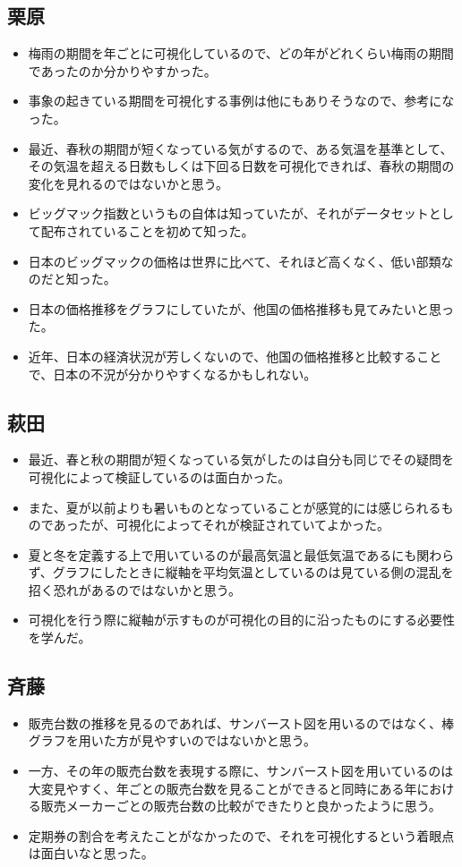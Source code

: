 \documentclass{jsarticle}
\begin{document}
\subsection*{栗原}
\begin{itemize}
    \item 梅雨の期間を年ごとに可視化しているので、どの年がどれくらい梅雨の期間であったのか分かりやすかった。
    \item 事象の起きている期間を可視化する事例は他にもありそうなので、参考になった。
    \item 最近、春秋の期間が短くなっている気がするので、ある気温を基準として、その気温を超える日数もしくは下回る日数を可視化できれば、春秋の期間の変化を見れるのではないかと思う。
    \item ビッグマック指数というもの自体は知っていたが、それがデータセットとして配布されていることを初めて知った。
    \item 日本のビッグマックの価格は世界に比べて、それほど高くなく、低い部類なのだと知った。
    \item 日本の価格推移をグラフにしていたが、他国の価格推移も見てみたいと思った。
    \item 近年、日本の経済状況が芳しくないので、他国の価格推移と比較することで、日本の不況が分かりやすくなるかもしれない。
\end{itemize}
\subsection*{萩田}
\begin{itemize}
    \item 最近、春と秋の期間が短くなっている気がしたのは自分も同じでその疑問を可視化によって検証しているのは面白かった。
    \item また、夏が以前よりも暑いものとなっていることが感覚的には感じられるものであったが、可視化によってそれが検証されていてよかった。
    \item 夏と冬を定義する上で用いているのが最高気温と最低気温であるにも関わらず、グラフにしたときに縦軸を平均気温としているのは見ている側の混乱を招く恐れがあるのではないかと思う。
    \item 可視化を行う際に縦軸が示すものが可視化の目的に沿ったものにする必要性を学んだ。
\end{itemize}
\subsection*{斉藤}
\begin{itemize}
    \item 販売台数の推移を見るのであれば、サンバースト図を用いるのではなく、棒グラフを用いた方が見やすいのではないかと思う。
    \item 一方、その年の販売台数を表現する際に、サンバースト図を用いているのは大変見やすく、年ごとの販売台数を見ることができると同時にある年における販売メーカーごとの販売台数の比較ができたりと良かったように思う。
    \item 定期券の割合を考えたことがなかったので、それを可視化するという着眼点は面白いなと思った。
\end{itemize}
\end{document}
